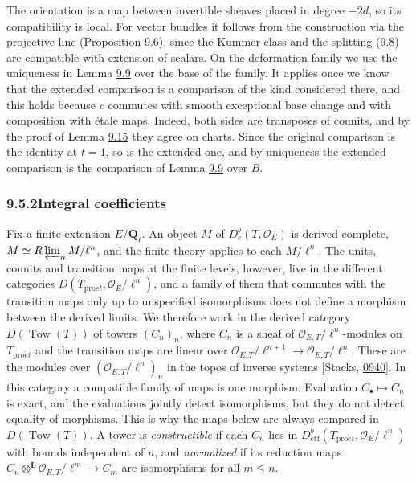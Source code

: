 \documentclass[11pt]{article}
\providecommand{\Dbc}{}\renewcommand{\Dbc}{D^b_c}
\begin{document}
The orientation is a map between invertible sheaves placed in degree \(-2d\), so its compatibility is local. For vector bundles it follows from the construction via the projective line (Proposition \hyperref[bp21]{9.6}), since the Kummer class and the splitting (9.8) are compatible with extension of scalars. On the deformation family we use the uniqueness in Lemma \hyperref[bp29]{9.9} over the base of the family. It applies once we know that the extended comparison is a comparison of the kind considered there, and this holds because \(c\) commutes with smooth exceptional base change and with composition with étale maps. Indeed, both sides are transposes of counits, and by the proof of Lemma \hyperref[bp49]{9.15} they agree on charts. Since the original comparison is the identity at \(t=1\), so is the extended one, and by uniqueness the extended comparison is the comparison of Lemma \hyperref[bp29]{9.9} over \(B\).


\subsubsection*{\texorpdfstring{9.5.2\quad Integral coefficients}{9.5.2 Integral coefficients}}
\label{bp52}%
\label{bp53}%
Fix a finite extension \(E/\mathbf Q_\ell\). An object \(M\) of \(\Dbc(T,\mathcal O_E)\) is derived complete, \(M\simeq R\varprojlim_nM/\ell^n\), and the finite theory applies to each \(M/\ell^n\). The units, counits and transition maps at the finite levels, however, live in the different categories \(D(T_{\mathrm{pro}\acute{e}t},\mathcal O_E/\ell^n)\), and a family of them that commutes with the transition maps only up to unspecified isomorphisms does not define a morphism between the derived limits. We therefore work in the derived category \(D(\operatorname{Tow}(T))\) of towers \((C_n)_n\), where \(C_n\) is a sheaf of \(\mathcal O_{E,T}/\ell^n\)-modules on \(T_{\mathrm{pro}\acute{e}t}\) and the transition maps are linear over \(\mathcal O_{E,T}/\ell^{n+1}\to\mathcal O_{E,T}/\ell^n\). These are the modules over \((\mathcal O_{E,T}/\ell^n)_n\) in the topos of inverse systems [Stacks, \href{https://stacks.math.columbia.edu/tag/0940}{0940}]. In this category a compatible family of maps is one morphism. Evaluation \(C_\bullet\mapsto C_n\) is exact, and the evaluations jointly detect isomorphisms, but they do not detect equality of morphisms. This is why the maps below are always compared in \(D(\operatorname{Tow}(T))\). A tower is \emph{constructible} if each \(C_n\) lies in \(D^b_{\mathrm{ctf}}(T_{\mathrm{pro}\acute{e}t},\mathcal O_E/\ell^n)\) with bounds independent of \(n\), and \emph{normalized} if its reduction maps \(C_n\otimes^{\mathbf L}\mathcal O_{E,T}/\ell^m\to C_m\) are isomorphisms for all \(m\le n\).
\end{document}
